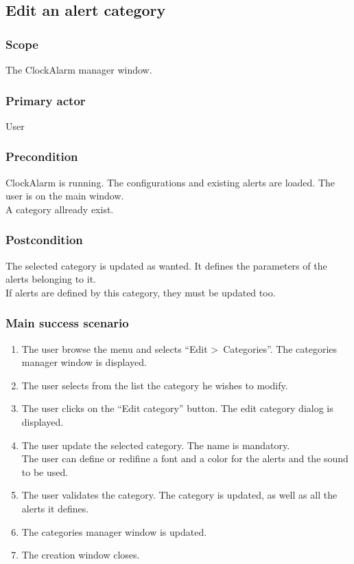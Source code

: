 \subsection{Edit an alert category}\label{subsec:usecase_edit_category}

\subsubsection{Scope}
The ClockAlarm manager window.
\subsubsection{Primary actor}
User
\subsubsection{Precondition}
ClockAlarm is running. The configurations and existing alerts are loaded. The user is on the main window.
\\A category allready exist.
\subsubsection{Postcondition}
The selected category is updated as wanted. It defines the parameters of the alerts belonging to it.
\\ If alerts are defined by this category, they must be updated too.
\subsubsection{Main success scenario}
\begin{enumerate}
	\item The user browse the menu and selects ``Edit \textgreater~Categories''. The categories manager window is displayed. 
	\item The user selects from the list the category he wishes to modify.
	\item The user clicks on the ``Edit category'' button. The edit category dialog is displayed.
	\item\label{itm:eaac_enter_sc}The user update the selected category. The name is mandatory. \\The user can define or redifine a font and a color for the alerts and the sound to be used.
	\item\label{itm:eaac_validate_sc} The user validates the category. The category is updated, as well as all the alerts it defines.
	\item The categories manager window is updated.
	\item The creation window closes.
\end{enumerate}
